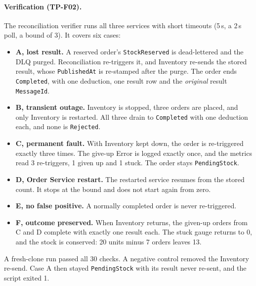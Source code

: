 \documentclass[a4paper]{report}
\begin{document}
\paragraph{Verification (TP-F02).} The reconciliation verifier
runs all three services with short timeouts (5\,s, a 2\,s poll, a bound of
3). It covers six cases:
\begin{itemize}
  \item \textbf{A, lost result.} A reserved order's \texttt{StockReserved} is
    dead-lettered and the DLQ purged. Reconciliation re-triggers it, and
    Inventory re-sends the stored result, whose \texttt{PublishedAt} is
    re-stamped after the purge. The order ends \texttt{Completed}, with one
    deduction, one result row and the \emph{original} result
    \texttt{MessageId}.
  \item \textbf{B, transient outage.} Inventory is stopped, three orders are
    placed, and only Inventory is restarted. All three drain to
    \texttt{Completed} with one deduction each, and none is
    \texttt{Rejected}.
  \item \textbf{C, permanent fault.} With Inventory kept down, the order is
    re-triggered exactly three times. The give-up Error is logged exactly
    once, and the metrics read 3 re-triggers, 1 given up and 1 stuck. The
    order stays \texttt{PendingStock}.
  \item \textbf{D, Order Service restart.} The restarted service resumes from
    the stored count. It stops at the bound and does not start again from
    zero.
  \item \textbf{E, no false positive.} A normally completed order is never
    re-triggered.
  \item \textbf{F, outcome preserved.} When Inventory returns, the given-up
    orders from C and D complete with exactly one result each. The stuck
    gauge returns to 0, and the stock is conserved: 20 units minus 7 orders
    leaves 13.
\end{itemize}

A fresh-clone run passed all 30 checks. A negative control
removed the Inventory re-send. Case A then stayed \texttt{PendingStock} with
its result never re-sent, and the script exited 1.
\end{document}

